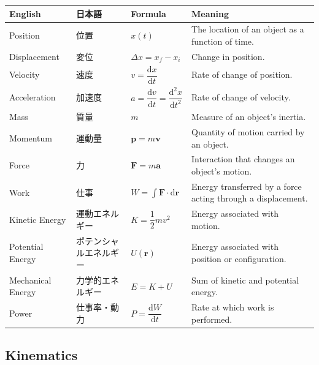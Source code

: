 \documentclass[11pt,a4paper]{article}
\newcommand{\dd}{\mathrm{d}}
\begin{document}
\begin{longtable}{p{} p{} p{} p{}}
\toprule
\textbf{English} & \textbf{日本語} & \textbf{Formula} & \textbf{Meaning} \\
\midrule
\endhead

Position & 位置 &
$x(t)$ &
The location of an object as a function of time. \\

Displacement & 変位 &
$\Delta x = x_f-x_i$ &
Change in position. \\

Velocity & 速度 &
$v=\dfrac{\dd x}{\dd t}$ &
Rate of change of position. \\

Acceleration & 加速度 &
$a=\dfrac{\dd v}{\dd t}
=\dfrac{\dd^2x}{\dd t^2}$ &
Rate of change of velocity. \\

Mass & 質量 &
$m$ &
Measure of an object's inertia. \\

Momentum & 運動量 &
$\bm{p}=m\bm{v}$ &
Quantity of motion carried by an object. \\

Force & 力 &
$\bm{F}=m\bm{a}$ &
Interaction that changes an object's motion. \\

Work & 仕事 &
$W=\int \bm{F}\cdot\dd\bm{r}$ &
Energy transferred by a force acting through a displacement. \\

Kinetic Energy & 運動エネルギー &
$K=\dfrac{1}{2}mv^2$ &
Energy associated with motion. \\

Potential Energy & ポテンシャルエネルギー &
$U(\bm{r})$ &
Energy associated with position or configuration. \\

Mechanical Energy & 力学的エネルギー &
$E=K+U$ &
Sum of kinetic and potential energy. \\

Power & 仕事率・動力 &
$P=\dfrac{\dd W}{\dd t}$ &
Rate at which work is performed. \\

\bottomrule
\end{longtable}

\subsection{Kinematics}
\end{document}

